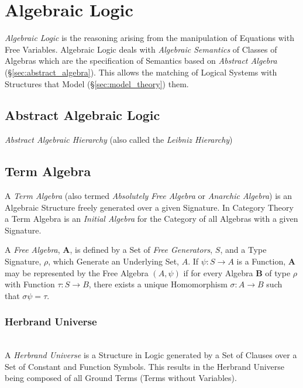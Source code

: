 \documentclass{article}
\begin{document}
\section{Algebraic Logic}

\emph{Algebraic Logic} is the reasoning arising from the manipulation
of Equations with Free Variables. Algebraic Logic deals with
\emph{Algebraic Semantics} of Classes of Algebras which are the
specification of Semantics based on \emph{Abstract Algebra}
(\S\ref{sec:abstract_algebra}). This allows the matching of Logical
Systems with Structures that Model (\S\ref{sec:model_theory}) them.

\subsection{Abstract Algebraic Logic}

\emph{Abstract Algebraic Hierarchy} (also called the \emph{Leibniz Hierarchy})

\subsection{Term Algebra}\label{subsec:term_algebra}

A \emph{Term Algebra} (also termed \emph{Absolutely Free Algebra} or
\emph{Anarchic Algebra}) is an Algebraic Structure freely generated
over a given Signature. In Category Theory a Term Algebra is an
\emph{Initial Algebra} for the Category of all Algebras with a given
Signature.

A \emph{Free Algebra}, $\mathbf{A}$, is defined by a Set of \emph{Free
  Generators}, $S$, and a Type Signature, $\rho$, which Generate an
Underlying Set, $A$. If $\psi : S \rightarrow A$ is a Function,
$\mathbf{A}$ may be represented by the Free Algebra $(A,\psi)$ if for
every Algebra $\mathbf{B}$ of type $\rho$ with Function $\tau : S
\rightarrow B$, there exists a unique Homomorphism $\sigma : A
\rightarrow B$ such that $\sigma\psi = \tau$.

\subsubsection{Herbrand Universe}\label{subsec:herbrand_universe}
\hfill \\
A \emph{Herbrand Universe} is a Structure in Logic generated by a Set
of Clauses over a Set of Constant and Function Symbols. This results
in the Herbrand Universe being composed of all Ground Terms (Terms
without Variables).
\end{document}
